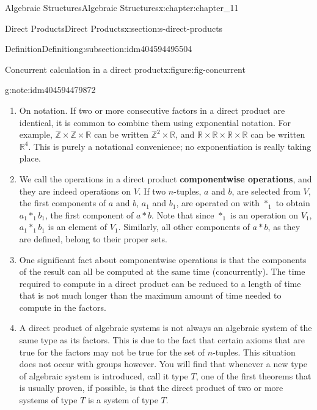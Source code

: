 \documentclass[twoside,10pt,]{book}
\newcommand{\terminology}[1]{\textbf{#1}}
\numberwithin{equation}{section}
\begin{document}
\begin{chapterptx}{Algebraic Structures}{}{Algebraic Structures}{}{}{x:chapter:chapter_11}
\begin{sectionptx}{Direct Products}{}{Direct Products}{}{}{x:section:s-direct-products}
\begin{subsectionptx}{Definition}{}{Definition}{}{}{g:subsection:idm404594495504}
\begin{figureptx}{Concurrent calculation in a direct product}{x:figure:fig-concurrent}{}
\begin{image}{0.15}{0.7}{0.15}
\end{image}%
\tcblower
\end{figureptx}%
\begin{note}{}{g:note:idm404594479872}%
%
\begin{enumerate}[label=(\alph*)]
\item{}On notation. If two or more consecutive factors in a direct product are identical, it is common to combine them using exponential notation. For example, \(\mathbb{Z} \times  \mathbb{Z} \times  \mathbb{R}\) can be written \(\mathbb{Z}^2 \times  \mathbb{R}\), and \(\mathbb{R} \times  \mathbb{R}
\times  \mathbb{R} \times  \mathbb{R}\) can be written \(\mathbb{R}^4\). This is purely a notational convenience; no exponentiation is really taking place.%
\item{}We call the operations in a direct product \terminology{componentwise operations}, and they are indeed operations on \(V\).  If two \(n\)-tuples, \(a\) and \(b\), are selected from \(V\), the first components of \(a\) and \(b\), \(a_1\) and \(b_1\), are operated on with \(*_1\) to obtain \(a_1*_1b_1\), the first component of \(a * b\). Note that since \(*_1\) is an operation on \(V_1\), \(a_1*_1b_1\) is an element of \(V_1\). Similarly, all other components of \(a * b\), as they are defined, belong to their proper sets.%
\item{}One significant fact about componentwise operations is that the components of the result can all be computed at the same time (concurrently). The time required to compute in a direct product can be reduced to a length of time that is not much longer than the maximum amount of time needed to compute in the factors.%
\item{}A direct product of algebraic systems is not always an algebraic system of the same type as its factors. This is due to the fact that certain axioms that are true for the factors may not be true for the set of \(n\)-tuples. This situation does not occur with groups however. You will find that whenever a new type of algebraic system is introduced, call it type \(T\), one of the first theorems that is usually proven, if possible, is that the direct product of two or more systems of type \(T\) is a system of type \(T\).%
\end{enumerate}
%
\end{note}
\end{subsectionptx}
%
%
\typeout{************************************************}
\typeout{************************************************}

\end{sectionptx}
\end{chapterptx}
\end{document}
